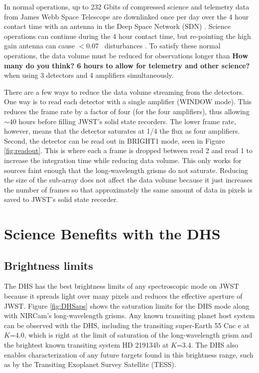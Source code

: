 \documentclass{emulateapj}
\begin{document}
In normal operations, up to 232 Gbits of compressed science and telemetry data from James Webb Space Telescope are downlinked once per day over the 4 hour contact time with an antenna in the Deep Space Network (SDN)  \citep{dashevsky2008groundflight}. Science operations can continue during the 4 hour contact time, but re-pointing the high gain antenna can cause $<$0.07 \arcsec\ disturbances \citep{beichman2014pasp}. To satisfy these normal operations, the data volume must be reduced for observations longer than \textbf{How many do you think? 6 hours to allow for telemetry and other science?} when using 3 detectors and 4 amplifiers simultaneously.

There are a few ways to reduce the data volume streaming from the detectors. One way is to read each detector with a single amplifier (WINDOW mode). This reduces the frame rate by a factor of four (for the four amplifiers), thus allowing $\sim$40 hours before filling JWST's solid state recorders. The lower frame rate, however, means that the detector saturates at 1/4 the flux as four amplifiers. Second, the detector can be read out in BRIGHT1 mode, seen in Figure \ref{fig:readout}. This is where each a frame is dropped between read 2 and read 1 to increase the integration time while reducing data volume. This only works for sources faint enough that the long-wavelength grisms do not saturate. Reducing the size of the sub-array does not affect the data volume because it just increases the number of frames so that approximately the same amount of data in pixels is saved to JWST's solid state recorder.

\section{Science Benefits with the DHS}\label{sec:addedScience}

\subsection{Brightness limits}\label{sec:brightness}

The DHS has the best brightness limits of any spectroscopic mode on JWST because it spreads light over many pixels and reduces the effective aperture of JWST. Figure \ref{fig:DHSaps} shows the saturation limits for the DHS mode along with NIRCam's long-wavelength grisms. Any known transiting planet host system can be observed with the DHS, including the transiting super-Earth  55 Cnc e \citep{mcarthur2004disc55cnce} at $K$=4.0, which is right at the limit of saturation of the long-wavelength grism and the brightest known transiting system HD 219134b \citep{motalebi2015hd219134b} at $K$=3.4. The DHS also enables characterization of any future targets found in this brightness range, such as by the Transiting Exoplanet Survey Satellite (TESS).
\end{document}
